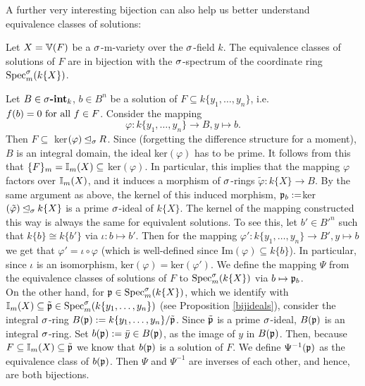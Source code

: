 A further very interesting bijection can also help us better understand equivalence classes of solutions: 
\begin{prop}\label{bijsols}
Let $X = \mathbb{V}(F)$ be a $\sigma$-m-variety over the $\sigma$-field $k$. The equivalence classes of solutions of $F$ are in bijection with the $\sigma$-spectrum of the coordinate ring $\operatorname{Spec}^\sigma_m(k\{X\})$.
\begin{bew}
Let $B \in \sigma\text{{\normalfont\textbf{-int}}}_k$, $b \in B^n$ be a solution of $F \subseteq k\{y_1,\ldots,y_n\}$, i.e. $f(b) = 0 \text{ for all } f \in F$. Consider the mapping $$\varphi: k\{y_1,\ldots,y_n\} \rightarrow B, y \mapsto b.$$
Then $F \subseteq $ ker$( \varphi) \unlhd_{\sigma} R$.
Since (forgetting the difference structure for a moment), $B$ is an integral domain, the ideal ker$(\varphi)$ has to be prime. It follows from this that $\{F\}_m = \mathbb{I}_m(X) \subseteq~$ker$(\varphi)$. 
In particular, this implies that the mapping $\varphi$ factors over $\mathbb{I}_m(X)$, and it induces a morphism of $\sigma$-rings $\tilde \varphi: k\{X\} \rightarrow B$. By the same argument as above, the kernel of this induced
morphism, $\mathfrak{p}_b := $ker$(\tilde \varphi) \unlhd_{\sigma} k\{X\}$ is a prime $\sigma$-ideal of $k\{X\}$. The kernel of the mapping constructed this way is always the same for equivalent solutions. To see this, let $b' \in B'^n$ such that $k\{b\} \cong k\{b'\}$ via $\iota: b \mapsto b'$.
Then for the mapping $\varphi': k\{y_1, \ldots, y_n\} \rightarrow B', y \mapsto b$ we get that $\varphi' = \iota \circ \varphi$ (which is well-defined since Im$(\varphi)\subseteq k\{b\}$). In particular, since $\iota$ is an isomorphism, ker$(\varphi) = $ker$(\varphi')$. 
We define the mapping $\Psi$ from the equivalence classes of solutions of $F$ to $\operatorname{Spec}^\sigma_m(k\{X\})$ via $b \mapsto \mathfrak{p}_b$.\\ 

\indent On the other hand, for $\mathfrak{p} \in \operatorname{Spec}^\sigma_m(k\{X\})$, which we identify with \\$\mathbb{I}_m(X) \subseteq \tilde {\mathfrak{p}} \in \operatorname{Spec}^\sigma_m(k\{y_1,\ldots,y_n\})$ (see Proposition \ref{bijideals}), consider the integral $\sigma$-ring $B(\mathfrak{p}):= k\{y_1,\ldots,y_n\}/ \tilde {\mathfrak{p}}$.
Since $\tilde {\mathfrak{p}}$ is a prime $\sigma$-ideal, $B(\mathfrak{p})$ is an integral $\sigma$-ring. Set $b(\mathfrak{p}) := \bar y \in B(\mathfrak{p})$, as the image of $y$ in $B(\mathfrak{p})$. Then, because $F \subseteq \mathbb{I}_m(X) \subseteq \tilde {\mathfrak{p}}$ we know that $b(\mathfrak{p})$ is a solution of $F$. 
We define $\Psi^{-1}(\mathfrak{p})$ as the equivalence class of $b(\mathfrak{p})$. Then $\Psi$ and $\Psi^{-1}$ are inverses of each other, and hence, are both bijections.
\end{bew}
\end{prop}


